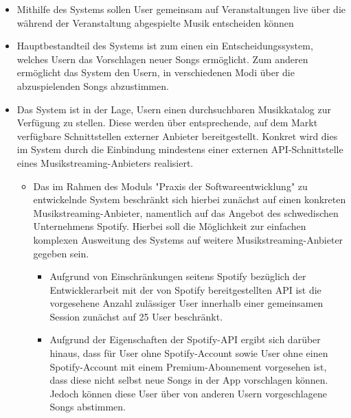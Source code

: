 \documentclass[oneside, ngerman]{sdqtechreport}
\begin{document}
\begin{itemize}
    \item Mithilfe des Systems sollen User gemeinsam auf Veranstaltungen live über die während der Veranstaltung abgespielte Musik entscheiden können
    \item Hauptbestandteil des Systems ist zum einen ein Entscheidungssystem, welches Usern das Vorschlagen neuer Songs ermöglicht. Zum anderen ermöglicht das System den Usern, in verschiedenen Modi über die abzuspielenden Songs abzustimmen.
    \item Das System ist in der Lage, Usern einen durchsuchbaren Musikkatalog zur Verfügung zu stellen. Diese werden über entsprechende, auf dem Markt verfügbare Schnittstellen externer Anbieter bereitgestellt. Konkret wird dies im System durch die Einbindung mindestens einer externen API-Schnittstelle eines Musikstreaming-Anbieters realisiert.
    \begin{itemize}
        \item Das im Rahmen des Moduls "Praxis der Softwareentwicklung" zu entwickelnde System beschränkt sich hierbei zunächst auf einen konkreten Musikstreaming-Anbieter, namentlich auf das Angebot des schwedischen Unternehmens Spotify. Hierbei soll die Möglichkeit zur einfachen komplexen Ausweitung des Systems auf weitere Musikstreaming-Anbieter gegeben sein.
        \begin{itemize}
            \item Aufgrund von Einschränkungen seitens Spotify bezüglich der Entwicklerarbeit mit der von Spotify bereitgestellten API ist die vorgesehene Anzahl zulässiger User innerhalb einer gemeinsamen Session zunächst auf 25 User beschränkt.
            \item Aufgrund der Eigenschaften der Spotify-API ergibt sich darüber hinaus, dass für User ohne Spotify-Account sowie User ohne einen Spotify-Account mit einem Premium-Abonnement vorgesehen ist, dass diese nicht selbst neue Songs in der App vorschlagen können. Jedoch können diese User über von anderen Usern vorgeschlagene Songs abstimmen.
        \end{itemize}


\end{itemize}
\end{itemize}
\end{document}
